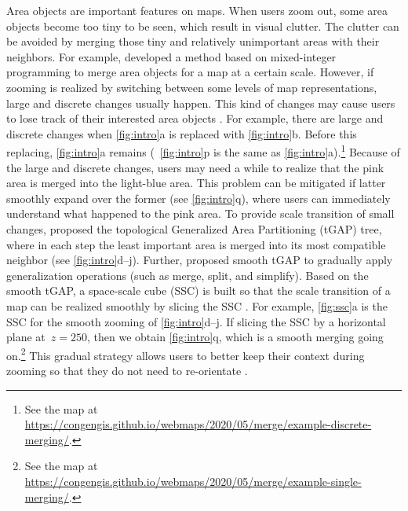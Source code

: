 \documentclass[]{interact}
\begin{document}
Area objects are important features on maps. 
When users zoom out,
some area objects become too tiny to be seen,
which result in visual clutter.
The clutter can be avoided by merging 
those tiny and relatively unimportant areas with their neighbors.
For example, \citet{haunert2008f} developed a method based on
mixed-integer programming to merge area objects
for a map at a certain scale.
However, if zooming is realized by switching between
some levels of map representations, 
large and discrete changes usually happen.
This kind of changes may cause users to lose track of
their interested area objects \citep{vanKreveld2001}.
For example, there are large and discrete changes when
\fig\ref{fig:intro}a is replaced with \fig\ref{fig:intro}b.
Before this replacing, \fig\ref{fig:intro}a remains
(\eg~\fig\ref{fig:intro}p is the same as \fig\ref{fig:intro}a).\footnote{%
See the map at
\url{https://congengis.github.io/webmaps/2020/05/merge/example-discrete-merging/}.}
Because of the large and discrete changes,
users may need a while to realize that 
the pink area is merged into the light-blue area.
This problem can be mitigated if latter smoothly expand over the former
(see \fig\ref{fig:intro}q), where users can immediately understand 
what happened to the pink area. 
To provide scale transition of small changes, 
\citet{vanOosterom2005} proposed 
the topological Generalized Area Partitioning (tGAP) tree,
where in each step the least important area is merged into
its most compatible neighbor 
(see \figs\ref{fig:intro}d--j).
Further, \citet{vanOosterom2014Support} proposed smooth tGAP
to gradually apply generalization operations 
(such as merge, split, and simplify).
Based on the smooth tGAP, a space-scale cube (SSC) is built so that 
the scale transition of a map can be realized smoothly
by slicing the SSC \citep[see][]{Meijers2020Web}.
For example, \fig\ref{fig:ssc}a is the SSC 
for the smooth zooming of \figs\ref{fig:intro}d--j.
If slicing the SSC by a horizontal plane at~$z=250$,
then we obtain \fig\ref{fig:intro}q, 
which is a smooth merging going on.\footnote{%
See the map at
\url{https://congengis.github.io/webmaps/2020/05/merge/example-single-merging/}.}
This gradual strategy allows users 
to better keep their context during zooming
so that they do not need to re-orientate
\citep{Noellenburg2008}.
\end{document}
